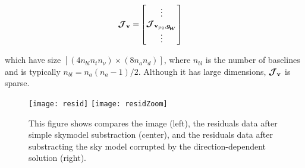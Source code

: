 \begin{alignat}{2}
\label{eq:J}
\bm{\mathcal{J}}_{\textbf{v}}=&
\begin{bmatrix} 
\vdots \\ 
\bm{\mathcal{J}}_{{\textbf{v}_{pq}},\bm{g_{\!_{W}}}}\\ 
\vdots \\ 
\end{bmatrix}
\end{alignat}

\noindent which have size $[(4n_{bl} n_t n_{\nu})\times (8n_a n_d)]$,
where $n_{bl}$ is the number of baselines and is typically
$n_{bl}=n_a(n_a-1)/2$. Although it has large dimensions, $\bm{\mathcal{J}}_{\textbf{v}}$ is
sparse.



\begin{figure*}[ht!]
\begin{center}
\texttt{[image: resid]}
\texttt{[image: residZoom]}
\caption{\label{fig:resid} This figure shows compares the image
  (left), the residuals data after simple skymodel substraction
  (center), and the residuals data after substracting the
  sky model corrupted by the direction-dependent solution (right).}
\end{center}
\end{figure*}

